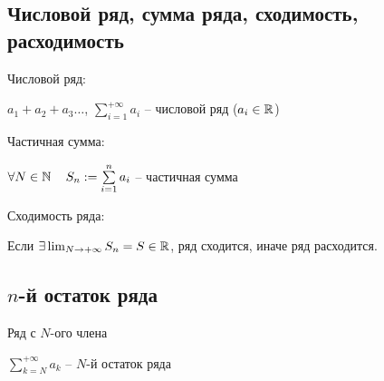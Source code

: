 \documentclass[../main.tex]{subfiles}
\begin{document}
\subsection{Числовой ряд, сумма ряда, сходимость, расходимость}
Числовой ряд:
\newline

$a_1+a_2+a_3\ldots $, $\sum\limits_{i=1}^{+\infty} a_i$ -- числовой ряд ($a_i\in\mathbb{R}$)
\newline

Частичная сумма:
\newline

$\forall N\in\operatorname*{\mathbb{N}} \quad S_n:=\sum\limits_{i=1}^n a_i$ -- частичная сумма
\newline

Сходимость ряда:
\newline

Если $\exists \lim_{N\to+\infty} S_n=S\in\mathbb{R}$, ряд сходится, иначе ряд расходится.


\subsection{$n$-й остаток ряда}
Ряд с $N$-ого члена
\newline

$\sum\limits_{k=N}^{+\infty} a_k$ -- $N$-й остаток ряда
\end{document}
